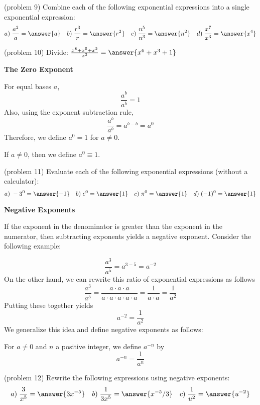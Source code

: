 \documentclass[handout]{ximera}
\begin{document}
\begin{problem}(problem 9)
Combine each of the following exponential expressions into a single exponential expression:
\[
a) \;\frac{a^2}{a} = \answer{a} \quad b) \;\frac{r^3}{r} = \answer{r^2} \quad c) \;\frac{n^5}{n^3} = \answer{n^2} 
\quad d) \;\frac{x^7}{x^3} = \answer{x^4}
\]
\end{problem}


\begin{problem}(problem 10)
Divide: $\frac{x^8 + x^5 + x^2}{x^2} = \answer{x^6 + x^3 + 1}$
\end{problem}


\begin{center}
\textbf{The Zero Exponent}
\end{center}
For equal bases $a$,
\[
\frac{a^b}{a^b} = 1
\] 
Also, using the exponent subtraction rule, 
\[
\frac{a^b}{a^b} = a^{b-b} = a^0
\] 
Therefore, we define $a^0 = 1$ for $a \neq 0$.

\begin{definition} 
If $a \neq 0$, then we define $a^0 \equiv 1$.
\end{definition}

\begin{problem}(problem 11)
Evaluate each of the following exponential expressions (without a calculator):
\[
a) \;-3^0 = \answer{-1} \quad b) \;e^0 = \answer{1} \quad c) \;\pi^0 = \answer{1} \quad d) \;(-1)^0 = \answer{1}
\]
\end{problem}

\begin{center}
\textbf{Negative Exponents}
\end{center}
If the exponent in the denominator is greater than the exponent in the numerator, 
then subtracting exponents yields a negative exponent. Consider the following example:

\[
\frac{a^3}{a^5} = a^{3-5} = a^{-2}
\]
On the other hand, we can rewrite this ratio of exponential expressions as follows
\[
\frac{a^3}{a^5} = \frac{a\cdot a\cdot a}{a\cdot a\cdot a \cdot a\cdot a} = \frac{1}{a\cdot a} = \frac{1}{a^2}
\]
Putting these together yields
\[
a^{-2} = \frac{1}{a^2}
\]
We generalize this idea and define negative exponents as follows:
\begin{definition} For $a \neq 0$ and $n$ a positive integer, we define $a^{-n}$ by
\[
a^{-n} = \frac{1}{a^n}
\]
\end{definition}

\begin{problem}(problem 12)
Rewrite the following expressions using negative exponents:
\[
a) \;\frac{3}{x^5} = \answer{3x^{-5}} \quad b) \;\frac{1}{3x^5} = \answer{x^{-5}/3} \quad c) \;\frac{1}{u^2} = \answer{u^{-2}}
\]
\end{problem}
\end{document}
